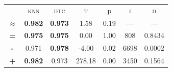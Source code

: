 \begin{tabular}{c||cc||c|c|c||c}
\midrule	&\textsc{knn} & \textsc{dtc} & \textsc{t} & p & \textsc{i} & \textsc{d}\\
	\color{black} $\approx$ & \color{black} \bfseries 0.982 &\color{black}  \bfseries 0.973 & 1.58 & 0.19 & --- & ---\\\midrule
	{\bfseries\color{black}\tiny=}& \color{black} \bfseries 0.975 & \color{black} \bfseries 0.975 & 0.00 & 1.00 & 808 & \color{black} 0.8434\\
	{\bfseries\color{blue}\tiny-}& \color{blue}  0.971 & \color{blue} \bfseries 0.978 & -4.00 & 0.02 & 6698 & \color{blue} 0.0002\\
	{\bfseries\color{red}\tiny+}& \color{red} \bfseries 0.982 & \color{red}  0.973 & 278.18 & 0.00 & 3450 & \color{red} 0.1564\\
\bottomrule\end{tabular}


